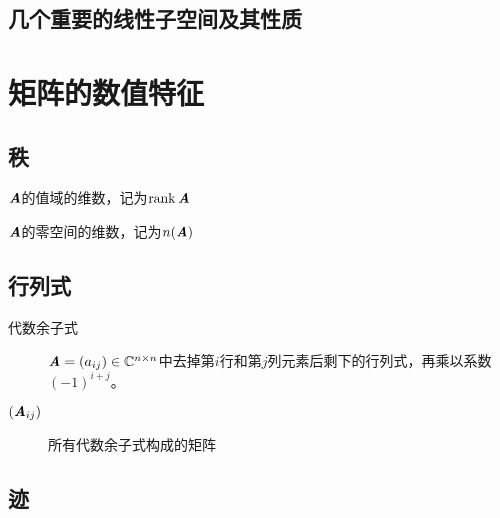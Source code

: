 \begin{definition}
\end{definition}

\subsection{几个重要的线性子空间及其性质}
\label{sub:几个重要的线性子空间及其性质}

\begin{definition}
\end{definition}

\begin{definition}
\end{definition}

\section{矩阵的数值特征}
\label{sec:矩阵的数值特征}

\subsection{秩}
\label{sub:秩}

\begin{definition}[秩]
    $\boldsymbol{\mathit{A}}$的值域的维数，记为$\mathrm{rank}\,\boldsymbol{\mathit{A}}$
\end{definition}

\begin{definition}[零度]
    $\boldsymbol{\mathit{A}}$的零空间的维数，记为$n(\boldsymbol{\mathit{A}})$
\end{definition}

\subsection{行列式}
\label{sub:行列式}

\begin{definition}
    \begin{description}
        \item[代数余子式] $\boldsymbol{\mathit{A}} = (a_{ij}) \in \mathbb{C}^{n \times n}$中去掉第$i$行和第$j$列元素后剩下的行列式，再乘以系数$(-1)^{i+j}$。
        \item[$(\boldsymbol{\mathit{A}}_{ij})$] 所有代数余子式构成的矩阵
    \end{description}
\end{definition}

\subsection{迹}
\label{sub:迹}

